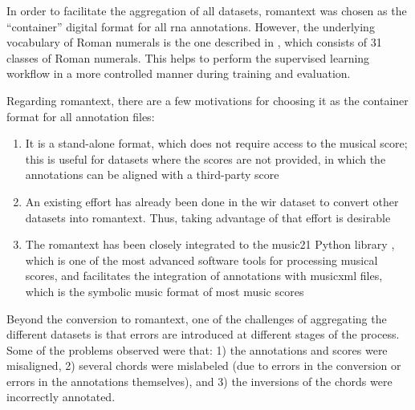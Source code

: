 
In order to facilitate the aggregation of all datasets,
\gls{romantext} was chosen as the ``container'' digital
format for all \gls{rna} annotations. However, the
underlying vocabulary of Roman numerals is the one described
in , which consists of
31 classes of Roman numerals. This helps to perform the
supervised learning workflow in a more controlled manner
during training and evaluation.

Regarding \gls{romantext}, there are a few motivations for
choosing it as the container format for all annotation
files:

\begin{enumerate} 
    \item It is a stand-alone format, which does not require
    access to the musical score; this is useful for datasets
    where the scores are not provided, in which the
    annotations can be aligned with a third-party score
    \item An existing effort has already been done in the
    \gls{wir} dataset
    \parencite{gotham2019romantext, gotham2022openscore}
    to convert other datasets into \gls{romantext}. Thus,
    taking advantage of that effort is desirable 
    \item The \gls{romantext} has been closely integrated to
    the music21 Python library
    \parencite{cuthbert2010music21}, which is one of the
    most advanced software tools for processing musical
    scores, and facilitates the integration of annotations
    with \gls{musicxml} files, which is the symbolic music
    format of most music scores 
\end{enumerate}

Beyond the conversion to \gls{romantext}, one of the
challenges of aggregating the different datasets is that
errors are introduced at different stages of the process.
Some of the problems observed were that: 1) the annotations
and scores were misaligned, 2) several chords were
mislabeled (due to errors in the conversion or errors in the
annotations themselves), and 3) the inversions of the chords
were incorrectly annotated.


